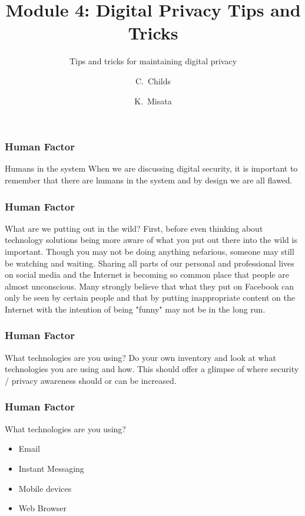 \documentclass{beamer}
\title[Module 4: Digital Privacy Tips]
{Module 4: Digital Privacy Tips and Tricks}
\subtitle{Tips and tricks for maintaining digital privacy}
\author[C, Childs]
{C.~Childs\inst{1} \and K.~Misata\inst{2}}
\institute[Tor Project]
{
  \inst{1}
  Support assistant / Translation coordinator\\
  The Tor Project
  \and
  \inst{2}
  Outreach coordinator\\
  The Tor Project
}
\begin{document}
\frame{\titlepage}

\begin{frame}
\frametitle{Human Factor}
	\begin{block}{Humans in the system}
		When we are discussing digital security, it is important to remember that there are humans in the system and by design we are all flawed.
	\end{block}
\end{frame}

\begin{frame}
\frametitle{Human Factor}
        \begin{block}{What are we putting out in the wild?}
        First, before even thinking about technology solutions being more aware of what you put out there into the wild is important.  Though you may not be doing anything nefarious, someone may still be watching and waiting.  Sharing all parts of our personal and professional lives on social media and the Internet is becoming so common place that people are almost unconscious.  Many strongly believe that what they put on Facebook can only be seen by certain people and that by putting inappropriate content on the Internet with the intention of being "funny" may not be in the long run.
	\end{block}
\end{frame}

\begin{frame}
\frametitle{Human Factor}
        \begin{block}{What technologies are you using?}
		Do your own inventory and look at what technologies you are using and how.  This should offer a glimpse of where security / privacy awareness should or can be increased.
        \end{block}
\end{frame}

\begin{frame}
\frametitle{Human Factor}
        \begin{block}{What technologies are you using?}
        	\begin{itemize}
			\item<1-> Email
			\item<2-> Instant Messaging
			\item<3-> Mobile devices
			\item<4-> Web Browser
		\end{itemize}
	\end{block}
\end{frame}
\end{document}
